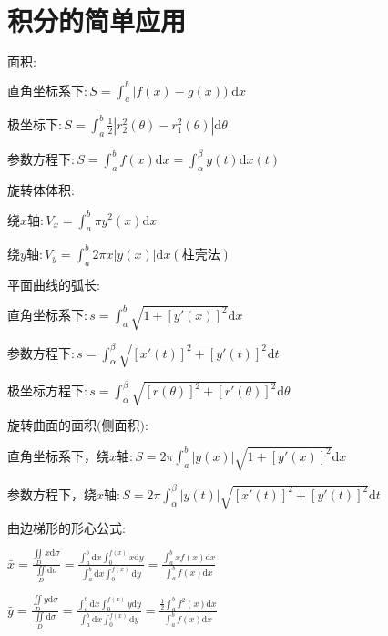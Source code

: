\section{积分的简单应用}

\begin{spacing}{\hangju}
    \noindent $\mbox{面积}\colon$

    $\displaystyle \mbox{直角坐标系下}\colon S = \int_{a}^{b}{|f(x) - g(x))|\mathrm{d}x}$

    $\displaystyle \mbox{极坐标下}\colon S = \int_{a}^{b}{\frac{1}{2}|r_{2}^{2}(\theta) - r_{1}^{2}(\theta)|\mathrm{d}\theta}$

    $\displaystyle \mbox{参数方程下}\colon S = \int_{a}^{b}{f(x)\mathrm{d}x} =\int_{\alpha}^{\beta}{y(t)\mathrm{d}x(t)}$

    \noindent $\mbox{旋转体体积}\colon$

    $\displaystyle \mbox{绕}x\mbox{轴}\colon V_{x} = \int_{a}^{b}{\pi y^2(x)\mathrm{d}x}$

    $\displaystyle \mbox{绕}y\mbox{轴}\colon V_{y} = \int_{a}^{b}{2\pi x|y(x)|\mathrm{d}x}(\mbox{柱壳法})$

    \noindent $\mbox{平面曲线的弧长}\colon$

    $\displaystyle \mbox{直角坐标系下}\colon s = \int_{a}^{b}{\sqrt{1 + [y'(x)]^2}\mathrm{d}x}$

    $\displaystyle \mbox{参数方程下}\colon s = \int_{\alpha}^{\beta}{\sqrt{[x'(t)]^2 + [y'(t)]^2}\mathrm{d}t}$

    $\displaystyle \mbox{极坐标方程下}\colon s = \int_{\alpha}^{\beta}{\sqrt{[r(\theta)]^2 + [r'(\theta)]^2}\mathrm{d}\theta}$

    \noindent $\mbox{旋转曲面的面积(侧面积)}\colon$

    $\displaystyle \mbox{直角坐标系下，绕}x\mbox{轴}\colon S = 2\pi\int_{a}^{b}{|y(x)|\sqrt{1 + [y'(x)]^2}\mathrm{d}x}$

    $\displaystyle \mbox{参数方程下，绕}x\mbox{轴}\colon S = 2\pi\int_{\alpha}^{\beta}{|y(t)|\sqrt{[x'(t)]^2 + [y'(t)]^2}\mathrm{d}t}$

    \noindent $\mbox{曲边梯形的形心公式}\colon$

    $\displaystyle \bar{x} = \frac{\iint\limits_D{x\mathrm{d}\sigma}}{\iint\limits_D{\mathrm{d}\sigma}} = \frac{\int_{a}^{b}{\mathrm{d}x}\int_{0}^{f(x)}{x\mathrm{d}y}}{\int_{a}^{b}{\mathrm{d}x}\int_{0}^{f(x)}{\mathrm{d}y}} = \frac{\int_{a}^{b}{xf(x)\mathrm{d}x}}{\int_{a}^{b}{f(x)\mathrm{d}x}}$

    $\displaystyle \bar{y} = \frac{\iint\limits_D{y\mathrm{d}\sigma}}{\iint\limits_D{\mathrm{d}\sigma}} = \frac{\int_{a}^{b}{\mathrm{d}x}\int_{0}^{f(x)}{y\mathrm{d}y}}{\int_{a}^{b}{\mathrm{d}x}\int_{0}^{f(x)}{\mathrm{d}y}} = \frac{\frac{1}{2}\int_{a}^{b}{f^{2}(x)\mathrm{d}x}}{\int_{a}^{b}{f(x)\mathrm{d}x}}$


\end{spacing}
